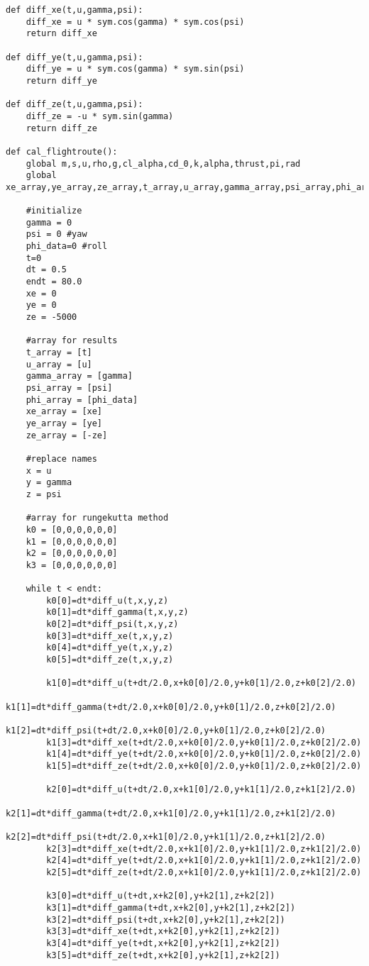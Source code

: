 \documentclass[15pt,uplatex,dvipdfmx]{jsarticle}
\begin{document}
\begin{lstlisting}[basicstyle=\ttfamily\footnotesize, frame=single]
def diff_xe(t,u,gamma,psi):
    diff_xe = u * sym.cos(gamma) * sym.cos(psi)
    return diff_xe

def diff_ye(t,u,gamma,psi):
    diff_ye = u * sym.cos(gamma) * sym.sin(psi)
    return diff_ye

def diff_ze(t,u,gamma,psi):
    diff_ze = -u * sym.sin(gamma)
    return diff_ze

def cal_flightroute():
    global m,s,u,rho,g,cl_alpha,cd_0,k,alpha,thrust,pi,rad
    global xe_array,ye_array,ze_array,t_array,u_array,gamma_array,psi_array,phi_array

    #initialize
    gamma = 0
    psi = 0 #yaw
    phi_data=0 #roll
    t=0
    dt = 0.5
    endt = 80.0
    xe = 0
    ye = 0
    ze = -5000

    #array for results
    t_array = [t]
    u_array = [u]
    gamma_array = [gamma]
    psi_array = [psi]
    phi_array = [phi_data]
    xe_array = [xe]
    ye_array = [ye]
    ze_array = [-ze]

    #replace names
    x = u
    y = gamma
    z = psi

    #array for rungekutta method
    k0 = [0,0,0,0,0,0]
    k1 = [0,0,0,0,0,0]
    k2 = [0,0,0,0,0,0]
    k3 = [0,0,0,0,0,0]

    while t < endt:
        k0[0]=dt*diff_u(t,x,y,z)
        k0[1]=dt*diff_gamma(t,x,y,z)
        k0[2]=dt*diff_psi(t,x,y,z)
        k0[3]=dt*diff_xe(t,x,y,z)
        k0[4]=dt*diff_ye(t,x,y,z)
        k0[5]=dt*diff_ze(t,x,y,z)

        k1[0]=dt*diff_u(t+dt/2.0,x+k0[0]/2.0,y+k0[1]/2.0,z+k0[2]/2.0)
        k1[1]=dt*diff_gamma(t+dt/2.0,x+k0[0]/2.0,y+k0[1]/2.0,z+k0[2]/2.0)
        k1[2]=dt*diff_psi(t+dt/2.0,x+k0[0]/2.0,y+k0[1]/2.0,z+k0[2]/2.0)
        k1[3]=dt*diff_xe(t+dt/2.0,x+k0[0]/2.0,y+k0[1]/2.0,z+k0[2]/2.0)
        k1[4]=dt*diff_ye(t+dt/2.0,x+k0[0]/2.0,y+k0[1]/2.0,z+k0[2]/2.0)
        k1[5]=dt*diff_ze(t+dt/2.0,x+k0[0]/2.0,y+k0[1]/2.0,z+k0[2]/2.0)

        k2[0]=dt*diff_u(t+dt/2.0,x+k1[0]/2.0,y+k1[1]/2.0,z+k1[2]/2.0)
        k2[1]=dt*diff_gamma(t+dt/2.0,x+k1[0]/2.0,y+k1[1]/2.0,z+k1[2]/2.0)
        k2[2]=dt*diff_psi(t+dt/2.0,x+k1[0]/2.0,y+k1[1]/2.0,z+k1[2]/2.0)
        k2[3]=dt*diff_xe(t+dt/2.0,x+k1[0]/2.0,y+k1[1]/2.0,z+k1[2]/2.0)
        k2[4]=dt*diff_ye(t+dt/2.0,x+k1[0]/2.0,y+k1[1]/2.0,z+k1[2]/2.0)
        k2[5]=dt*diff_ze(t+dt/2.0,x+k1[0]/2.0,y+k1[1]/2.0,z+k1[2]/2.0)

        k3[0]=dt*diff_u(t+dt,x+k2[0],y+k2[1],z+k2[2])
        k3[1]=dt*diff_gamma(t+dt,x+k2[0],y+k2[1],z+k2[2])
        k3[2]=dt*diff_psi(t+dt,x+k2[0],y+k2[1],z+k2[2])
        k3[3]=dt*diff_xe(t+dt,x+k2[0],y+k2[1],z+k2[2])
        k3[4]=dt*diff_ye(t+dt,x+k2[0],y+k2[1],z+k2[2])
        k3[5]=dt*diff_ze(t+dt,x+k2[0],y+k2[1],z+k2[2])


\end{lstlisting}
\end{document}
